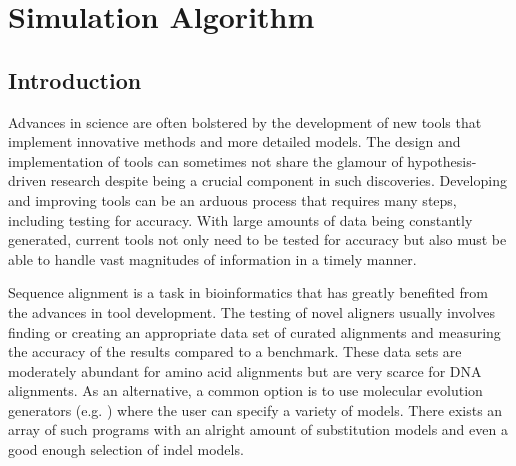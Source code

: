\chapter{Simulation Algorithm} \label{ch:sim}



\section{Introduction}
 



Advances in science are often bolstered by the development of new tools that implement innovative methods and more detailed models. The design and implementation of tools can sometimes not share the glamour of hypothesis-driven research despite being a crucial component in such discoveries. Developing and improving tools can be an arduous process that requires many steps, including testing for accuracy. With large amounts of data being constantly generated, current tools not only need to be tested for accuracy but also must be able to handle vast magnitudes of information in a timely manner.

Sequence alignment is a task in bioinformatics that has greatly benefited from the advances in tool development. The testing of novel aligners usually involves finding or creating an appropriate data set of curated alignments and measuring the accuracy of the results compared to a benchmark. These data sets are moderately abundant for amino acid alignments but are very scarce for DNA alignments. As an alternative, a common option is to use molecular evolution generators (e.g. ) where the user can specify a variety of models. There exists an array of such programs with an alright amount of substitution models and even a good enough selection of indel models.

